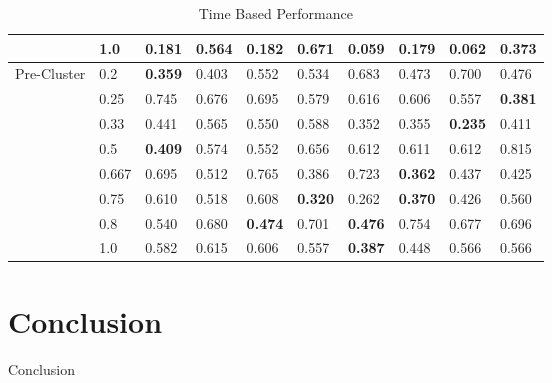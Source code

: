 \documentclass[12pt]{article}
\begin{document}
\begin{table}[h]
\begin{tabular}{|l|l|l|l|l|l|l|l|l|l|}
                                                   & 1.0                & 0.181       & 0.564       & 0.182        & 0.671       & 0.059       & 0.179       & {\bf 0.062} & 0.373       \\ \hline
\multicolumn{1}{|c|}{\multirow{8}{*}{Pre-Cluster}} & 0.2                & {\bf 0.359} & 0.403       & 0.552        & 0.534       & 0.683       & 0.473       & 0.700       & 0.476       \\
\multicolumn{1}{|c|}{}                             & 0.25               & 0.745       & 0.676       & 0.695        & 0.579       & 0.616       & 0.606       & 0.557       & {\bf 0.381} \\
\multicolumn{1}{|c|}{}                             & 0.33               & 0.441       & 0.565       & 0.550        & 0.588       & 0.352       & 0.355       & {\bf 0.235} & 0.411       \\
\multicolumn{1}{|c|}{}                             & 0.5                & {\bf 0.409} & 0.574       & 0.552        & 0.656       & 0.612       & 0.611       & 0.612       & 0.815       \\
\multicolumn{1}{|c|}{}                             & 0.667              & 0.695       & 0.512       & 0.765        & 0.386       & 0.723       & {\bf 0.362} & 0.437       & 0.425       \\
\multicolumn{1}{|c|}{}                             & 0.75               & 0.610       & 0.518       & 0.608        & {\bf 0.320} & 0.262       & {\bf 0.370} & 0.426       & 0.560       \\
\multicolumn{1}{|c|}{}                             & 0.8                & 0.540       & 0.680       & {\bf 0.474}  & 0.701       & {\bf 0.476} & 0.754       & 0.677       & 0.696       \\
\multicolumn{1}{|c|}{}                             & 1.0               & 0.582       & 0.615       & 0.606        & 0.557       & {\bf 0.387} & 0.448       & 0.566       & 0.566       \\ \hline
\end{tabular}
\caption{Time Based Performance}
\label{my-label}
\end{table}

\section{Conclusion}

\par{Conclusion}






\end{document}
